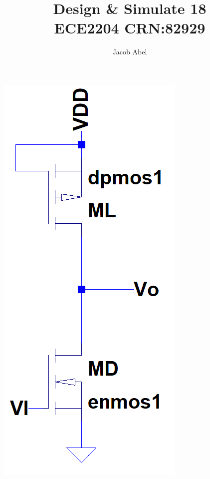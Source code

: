 \documentclass[12pt,letterpaper,titlepage]{article}
\author{Jacob Abel}
\title{	Design \& Simulate 18
	\\\large ECE2204 CRN:82929
}
\begin{document}
\maketitle
\begin{raggedright}
\begin{paracol}{2}
\switchcolumn
\begin{center}
\includegraphics[width=\textwidth, height=15\baselineskip, keepaspectratio=true]{ds1a}
\end{center}
\switchcolumn

\end{paracol}
\end{raggedright}
\end{document}
